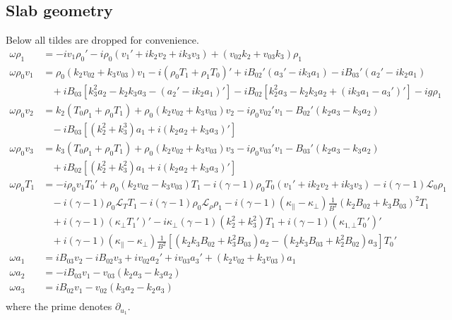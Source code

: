 \documentclass[11pt, fleqn]{article}
\newcommand{\HL}{\mathscr{L}}
\begin{document}
\subsection{Slab geometry}
Below all tildes are dropped for convenience.
\begin{equation}
	\begin{aligned}
		\omega \rho_1 		&= -iv_1\rho_0' - i\rho_0(v_1' + ik_2v_2 + ik_3v_3) + (v_{02}k_2 + v_{03}k_3)\rho_1																																									\\[8pt]
		\omega \rho_0 v_1	&= \rho_0(k_2 v_{02} + k_3 v_{03})v_1 - i(\rho_0 T_1 + \rho_1 T_0)' + iB_{02}'(a_3' - ik_3a_1) - iB_{03}'(a_2' - ik_2a_1)																						\\
											&~~~~ + iB_{03}\left[k_3^2a_2 - k_2k_3a_3 - (a_2' - ik_2a_1)'\right] - iB_{02}\left[k_2^2a_3 - k_2k_3a_2 + (ik_3a_1 - a_3')'\right]	 - ig\rho_1											\\[8pt]
		\omega \rho_0 v_2	&= k_2(T_0\rho_1 + \rho_0 T_1) + \rho_0(k_2 v_{02} + k_3v_{03})v_2 - i\rho_0v_{02}'v_1 - B_{02}'(k_2a_3 - k_3a_2) 																									\\
											&~~~~ - iB_{03}\left[(k_2^2 + k_3^3)a_1 + i(k_2a_2 + k_3a_3)'\right]																																																\\[8pt]
		\omega \rho_0 v_3	&= k_3(T_0\rho_1 + \rho_0 T_1) + \rho_0(k_2 v_{02} + k_3v_{03})v_3 - i\rho_0v_{03}'v_1 - B_{03}'(k_2a_3 - k_3a_2)																										\\
											&~~~~ + iB_{02}\left[(k_2^2 + k_3^2)a_1 + i(k_2a_2 + k_3a_3)'\right]																																																\\[8pt]
		\omega \rho_0 T_1	&= -i\rho_0v_1T_0' + \rho_0(k_2v_{02} - k_3v_{03})T_1 - i(\gamma - 1)\rho_0T_0(v_1' + ik_2v_2 + ik_3v_3) - i(\gamma - 1)\HL_0\rho_1																	\\
											&~~~~ - i(\gamma - 1)\rho_0\HL_T T_1 - i(\gamma - 1)\rho_0\HL_\rho \rho_1 - i(\gamma - 1)(\kappa_\parallel - \kappa_\bot)\frac{1}{B^2}(k_2B_{02} + k_3B_{03})^2T_1	\\
											&~~~~ + i(\gamma - 1)(\kappa_\bot T_1')' - i\kappa_\bot(\gamma - 1)(k_2^2 + k_3^2)T_1 + i(\gamma - 1)(\kappa_{1, \bot}T_0')'																				\\
											&~~~~ + i(\gamma - 1)(\kappa_\parallel - \kappa_\bot)\frac{1}{B^2}\left[(k_2k_3B_{02} + k_3^2B_{03})a_2 - (k_2k_3B_{03} + k_2^2B_{02})a_3\right]T_0'								\\[8pt]
		\omega a_1				&=  iB_{03}v_2 - iB_{02}v_3 + iv_{02}a_2' + iv_{03}a_3' + (k_2v_{02} + k_3v_{03})a_1																																								\\[8pt]
		\omega a_2				&= -iB_{03}v_1 - v_{03}(k_2a_3 - k_3a_2)																																																														\\[8pt]
		\omega a_3				&=  iB_{02}v_1 - v_{02}(k_3a_2 - k_2a_3)																																																					\\
	\end{aligned}
\end{equation}
where the prime denotes $\partial_{u_1}$.
\end{document}
